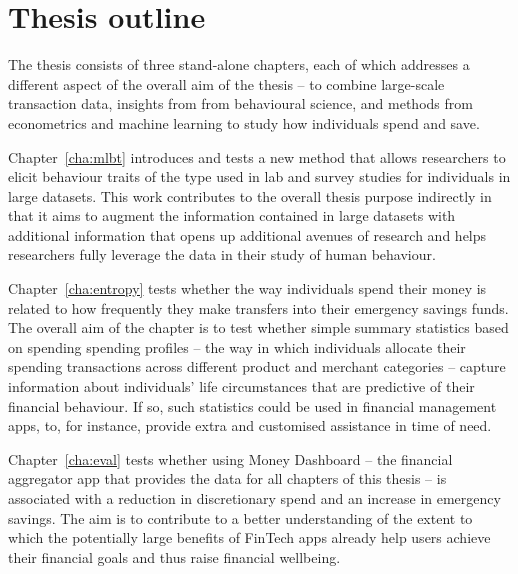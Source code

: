 
\section{Thesis outline}%
\label{sec:outline}

The thesis consists of three stand-alone chapters, each of which addresses a
different aspect of the overall aim of the thesis -- to combine large-scale
transaction data, insights from from behavioural science, and methods from
econometrics and machine learning to study how individuals spend and save. 

Chapter~\ref{cha:mlbt} introduces and tests a new method that allows
researchers to elicit behaviour traits of the type used in lab and survey
studies for individuals in large datasets. This work contributes to the overall
thesis purpose indirectly in that it aims to augment the information contained
in large datasets with additional information that opens up additional avenues
of research and helps researchers fully leverage the data in their study of
human behaviour.

Chapter~\ref{cha:entropy} tests whether the way individuals spend their money
is related to how frequently they make transfers into their emergency savings
funds. The overall aim of the chapter is to test whether simple summary
statistics based on spending spending profiles -- the way in which individuals
allocate their spending transactions across different product and merchant
categories -- capture information about individuals' life circumstances that
are predictive of their financial behaviour. If so, such statistics could be
used in financial management apps, to, for instance, provide extra and
customised assistance in time of need.

Chapter~\ref{cha:eval} tests whether using Money Dashboard -- the financial
aggregator app that provides the data for all chapters of this thesis -- is
associated with a reduction in discretionary spend and an increase in emergency
savings. The aim is to contribute to a better understanding of the extent to
which the potentially large benefits of FinTech apps already help users achieve
their financial goals and thus raise financial wellbeing.
